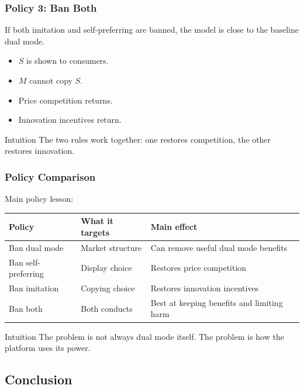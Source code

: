 \begin{frame}
  \frametitle{Policy 3: Ban Both}
  \small
  If both imitation and self-preferring are banned, the model is close to the baseline dual mode.

  \begin{itemize}
    \item $S$ is shown to consumers.
    \item $M$ cannot copy $S$.
    \item Price competition returns.
    \item Innovation incentives return.
  \end{itemize}

  \begin{alertblock}{Intuition}
    The two rules work together: one restores competition, the other restores innovation.
  \end{alertblock}
\end{frame}

\begin{frame}
  \frametitle{Policy Comparison}
  \small
  Main policy lesson:

  \begin{center}
    \begin{tabular}{lll}
      \toprule
      Policy & What it targets & Main effect \\
      \midrule
      Ban dual mode & Market structure & Can remove useful dual mode benefits \\
      Ban self-preferring & Display choice & Restores price competition \\
      Ban imitation & Copying choice & Restores innovation incentives \\
      Ban both & Both conducts & Best at keeping benefits and limiting harm \\
      \bottomrule
    \end{tabular}
  \end{center}

  \begin{block}{Intuition}
    The problem is not always dual mode itself. The problem is how the platform uses its power.
  \end{block}
\end{frame}

\subsection{Conclusion}

